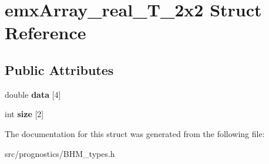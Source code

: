\hypertarget{structemxArray__real__T__2x2}{}\section{emx\+Array\+\_\+real\+\_\+\+T\+\_\+2x2 Struct Reference}
\label{structemxArray__real__T__2x2}
\subsection*{Public Attributes}
\begin{DoxyCompactItemize}
\item 
\mbox{\label{structemxArray__real__T__2x2_ad1ef1de350dda65aa413c5391c2fe575}} 
double {\bfseries data} \mbox{[}4\mbox{]}
\item 
\mbox{\label{structemxArray__real__T__2x2_a6f119a1050f3b1692148bb8bcf38f0ea}} 
int {\bfseries size} \mbox{[}2\mbox{]}
\end{DoxyCompactItemize}


The documentation for this struct was generated from the following file\+:\begin{DoxyCompactItemize}
\item 
src/prognostics/B\+H\+M\+\_\+types.\+h\end{DoxyCompactItemize}
